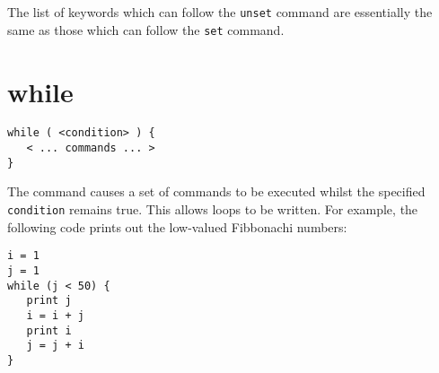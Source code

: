 The list of keywords which can follow the {\tt unset} command are essentially
the same as those which can follow the {\tt set} command.

\section{while}

\begin{verbatim}
while ( <condition> ) {
   < ... commands ... >
}
\end{verbatim}

The  command causes a set of commands to be executed whilst the
specified {\tt condition} remains true.  This allows loops to be written.  For
example, the following code prints out the low-valued Fibbonachi numbers:

\begin{verbatim}
i = 1
j = 1
while (j < 50) {
   print j
   i = i + j
   print i
   j = j + i
}
\end{verbatim}
